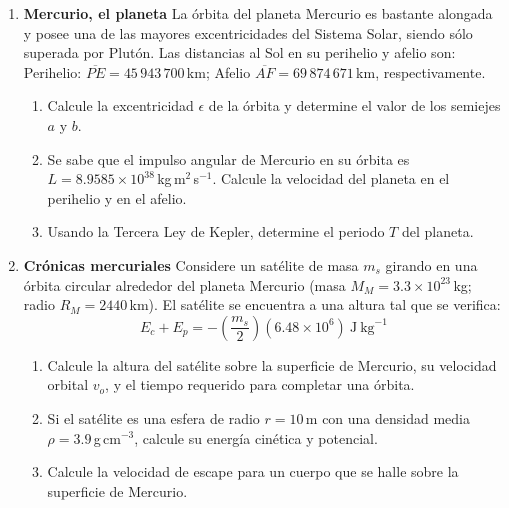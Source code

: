 \documentclass[a4paper,12pt]{article}
\begin{document}
\begin{enumerate}
	\item{\bf{Mercurio, el planeta}}
		La órbita del planeta Mercurio es bastante alongada y posee una de las
		mayores excentricidades del Sistema Solar, siendo sólo superada por
		Plutón. Las distancias al Sol en su perihelio y afelio son:
		Perihelio: $\overline{PE} = 45\,943\,700$\,km; Afelio $\overline{AF} =
		69\,874\,671$\,km, respectivamente.
		\begin{enumerate}
			\item Calcule la excentricidad $\epsilon$ de la órbita y determine
				el valor de los semiejes $a$ y $b$.
			\item Se sabe que el impulso angular de Mercurio en su órbita es $L
				= 8.9585 \times 10^{38}$\,kg\,m$^2$\,s$^{-1}$. Calcule la
				velocidad del planeta en el perihelio y en el afelio.
			\item Usando la Tercera Ley de Kepler, determine el periodo $T$ del
				planeta.
		\end{enumerate}
	\item{\bf{Crónicas mercuriales}}
		Considere un satélite de masa $m_s$ girando en una órbita circular
		alrededor del planeta Mercurio (masa $M_M = 3.3\times 10^{23}$\,kg;
		radio $R_M = 2440$\,km). El satélite se encuentra a una altura tal que
		se verifica:
		\[E_c + E_p = -\left ( \frac{m_s}{2} \right ) \left (6.48 \times
		10^6\right) \mathrm{\ J\ kg}^{-1} \]
		\begin{enumerate}
			\item Calcule la altura del satélite sobre la superficie de
				Mercurio, su velocidad orbital $v_o$, y el tiempo requerido
				para completar una órbita.
			\item Si el satélite es una esfera de radio $r=10$\,m con una
				densidad media $\rho =3.9$\,g\,cm$^{-3}$, calcule su energía
				cinética y potencial.
			\item Calcule la velocidad de escape para un cuerpo que se halle
				sobre la superficie de Mercurio.
		\end{enumerate}
\end{enumerate}
\end{document}
